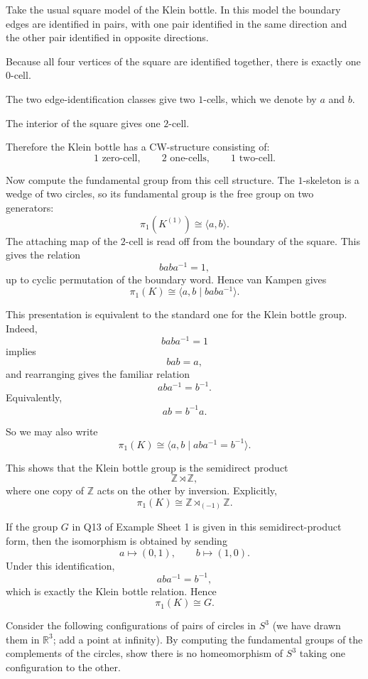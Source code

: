 \begin{solution}
Take the usual square model of the Klein bottle. In this model the boundary edges are identified in pairs, with one pair identified in the same direction and the other pair identified in opposite directions.

Because all four vertices of the square are identified together, there is exactly one \(0\)-cell.

The two edge-identification classes give two \(1\)-cells, which we denote by \(a\) and \(b\).

The interior of the square gives one \(2\)-cell.

Therefore the Klein bottle has a CW-structure consisting of:
\[
1 \text{ zero-cell},\qquad 2 \text{ one-cells},\qquad 1 \text{ two-cell}.
\]

Now compute the fundamental group from this cell structure. The \(1\)-skeleton is a wedge of two circles, so its fundamental group is the free group on two generators:
\[
\pi_1(K^{(1)})\cong \langle a,b\rangle.
\]
The attaching map of the \(2\)-cell is read off from the boundary of the square. This gives the relation
\[
baba^{-1}=1,
\]
up to cyclic permutation of the boundary word. Hence van Kampen gives
\[
\pi_1(K)\cong \langle a,b \mid baba^{-1}\rangle.
\]

This presentation is equivalent to the standard one for the Klein bottle group. Indeed,
\[
baba^{-1}=1
\]
implies
\[
bab=a,
\]
and rearranging gives the familiar relation
\[
aba^{-1}=b^{-1}.
\]
Equivalently,
\[
ab=b^{-1}a.
\]

So we may also write
\[
\pi_1(K)\cong \langle a,b \mid aba^{-1}=b^{-1}\rangle.
\]

This shows that the Klein bottle group is the semidirect product
\[
\mathbb Z \rtimes \mathbb Z,
\]
where one copy of \(\mathbb Z\) acts on the other by inversion. Explicitly,
\[
\pi_1(K)\cong \mathbb Z \rtimes_{(-1)} \mathbb Z.
\]

If the group \(G\) in Q13 of Example Sheet 1 is given in this semidirect-product form, then the isomorphism is obtained by sending
\[
a\mapsto (0,1),\qquad b\mapsto (1,0).
\]
Under this identification,
\[
aba^{-1}=b^{-1},
\]
which is exactly the Klein bottle relation. Hence
\[
\pi_1(K)\cong G.
\]
\end{solution}

\begin{problem}
Consider the following configurations of pairs of circles in \(S^3\) (we have drawn them in \(\mathbb{R}^3\); add a point at infinity). By computing the fundamental groups of the complements of the circles, show there is no homeomorphism of \(S^3\) taking one configuration to the other.

\par
\end{problem}

